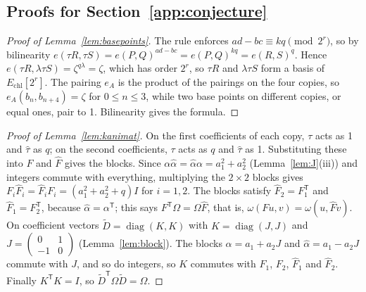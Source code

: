 \documentclass[version=preprint]{iacrcc}
\newcommand{\Echl}{E_{\mathrm{chl}}}
\begin{document}
    \subsection*{Proofs for Section~\ref{app:conjecture}}

    \begin{proof}[Proof of Lemma~\ref{lem:basepoints}]
        The rule enforces $ad - bc \equiv kq \pmod{2^r}$, so by bilinearity
        $e(\tau R, \tau S) = e(P, Q)^{ad - bc} = e(P, Q)^{kq} = e(R, S)^q$. Hence
        $e(\tau R, \lambda \tau S) = \zeta^{q\lambda} = \zeta$, which has order
        $2^r$, so $\tau R$ and $\lambda \tau S$ form a basis of $\Echl[2^r]$. The
        pairing $e_A$ is the product of the pairings on the four copies, so
        $e_A(b_n, b_{n+4}) = \zeta$ for $0 \le n \le 3$, while two base points on
        different copies, or equal ones, pair to 1. Bilinearity gives the formula.
    \end{proof}

    \begin{proof}[Proof of Lemma~\ref{lem:kanimat}]
        On the first coefficients of each copy, $\tau$ acts as 1 and
        $\widehat\tau$ as $q$; on the second coefficients, $\tau$ acts as $q$ and
        $\widehat\tau$ as 1. Substituting these into $F$ and $\widehat F$ gives the
        blocks. Since $\alpha\widehat\alpha = \widehat\alpha\alpha = a_1^2 + a_2^2$
        (Lemma~\ref{lem:J}(iii)) and integers commute with everything,
        multiplying the $2 \times 2$ blocks gives $F_i \widehat F_i = \widehat F_i
        F_i = (a_1^2 + a_2^2 + q) I$ for $i = 1, 2$. The blocks satisfy $\widehat
        F_2 = F_1^{\mathsf T}$ and $\widehat F_1 = F_2^{\mathsf T}$, because
        $\widehat\alpha = \alpha^{\mathsf T}$; this says $F^{\mathsf T} \Omega =
        \Omega \widehat F$, that is, $\omega(F u, v) = \omega(u, \widehat F v)$. On
        coefficient vectors $\tilde D = \operatorname{diag}(K, K)$ with $K =
        \operatorname{diag}(J, J)$ and $J = \left(\begin{smallmatrix} 0 & 1 \\ -1 &
            0 \end{smallmatrix}\right)$ (Lemma~\ref{lem:block}). The blocks $\alpha =
        a_1 + a_2 J$ and $\widehat\alpha = a_1 - a_2 J$ commute with $J$, and so
        do integers, so $K$ commutes with $F_1$, $F_2$, $\widehat F_1$ and $\widehat
        F_2$. Finally $K^{\mathsf T} K = I$, so $\tilde D^{\mathsf T} \Omega \tilde
        D = \Omega$.
    \end{proof}
\end{document}
